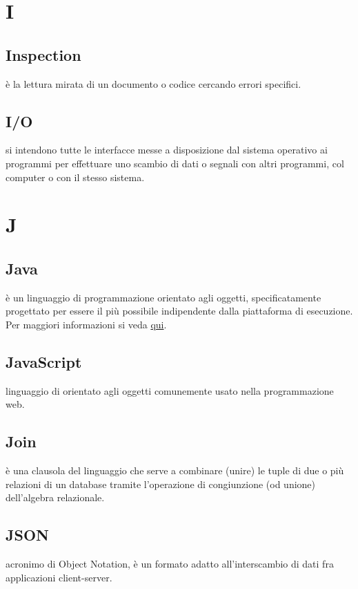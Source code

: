 \documentclass[12pt,a4paper]{article}
\begin{document}
\newpage

\section{I}	


\subsection{Inspection} 
 è la lettura mirata di un documento o codice cercando errori specifici.

\subsection{I/O} 
si intendono tutte le interfacce messe a disposizione dal sistema operativo ai programmi per effettuare uno scambio di dati o segnali con altri programmi, col computer o con il stesso sistema.


\newpage

\section{J}


\subsection{Java} 
 è un linguaggio di programmazione orientato agli oggetti, specificatamente progettato per essere il più possibile indipendente dalla piattaforma di esecuzione. Per maggiori informazioni si veda \href{https://it.wikipedia.org/wiki/Java_(linguaggio_di_programmazione)}{qui}.

\subsection{JavaScript} 
 linguaggio di  orientato agli oggetti comunemente usato nella programmazione web.

\subsection{Join} 
 è una clausola del linguaggio  che serve a combinare (unire) le tuple di due o più relazioni di un database tramite l'operazione di congiunzione (od unione) dell'algebra relazionale.

\subsection{JSON} 
 acronimo di  Object Notation, è un formato adatto all'interscambio di dati fra applicazioni client-server.
\end{document}
